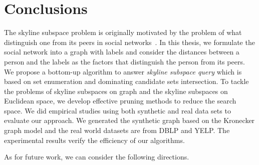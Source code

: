 
%
%

\chapter{Conclusions}
\label{ch:con}

The skyline subspace problem is originally motivated by the problem of what distinguish one from its peers in social networks~\cite{lo2013distinguish}. In this thesis, we formulate the social network into a graph with labels and consider the distances between a person and the labels as the factors that distinguish the person from its peers. We propose a bottom-up algorithm to answer \emph{skyline subspace query} which is based on set enumeration and dominating candidate sets intersection. To tackle the problems of skyline subspaces on graph and the skyline subspaces on Euclidean space, we develop effective pruning methods to reduce the search space. 
We did empirical studies using both synthetic and real data sets to evaluate our approach. We generated the synthetic graph based on the Kronecker graph model and the real world datasets are from DBLP and YELP. The experimental results verify the efficiency of our algorithms.

As for future work, we can consider the following directions.  

